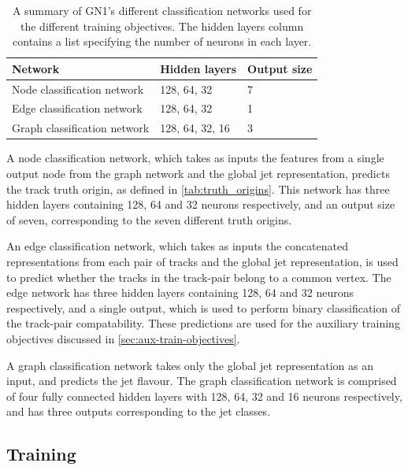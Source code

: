 \begin{table}[!htbp]
  \footnotesize\centering
  \setlength{\tabcolsep}{0.5em} %
  \caption{
      A summary of GN1's different classification networks used for the different training objectives.
      The hidden layers column contains a list specifying the number of neurons in each layer.
      }
  \begin{tabular}{lll}
      \toprule 
      \textbf{Network} & \textbf{Hidden layers} & \textbf{Output size} \\
      \hline
      Node classification network    & 128, 64, 32 & 7 \\
      Edge classification network    & 128, 64, 32 & 1 \\
      Graph classification network   & 128, 64, 32, 16 & 3 \\
      \bottomrule
  \end{tabular}
  \vspace{4mm}
  \label{tab:architecture}
\end{table}



A node classification network, which takes as inputs the features from a single output node from the graph network and the global jet representation, predicts the track truth origin, as defined in \cref{tab:truth_origins}.
This network has three hidden layers containing 128, 64 and 32 neurons respectively, and an output size of seven, corresponding to the seven different truth origins.

An edge classification network, which takes as inputs the concatenated representations from each pair of tracks and the global jet representation, is used to predict whether the tracks in the track-pair belong to a common vertex.
The edge network has three hidden layers containing 128, 64 and 32 neurons respectively, and a single output, which is used to perform binary classification of the track-pair compatability.
These predictions are used for the auxiliary training objectives discussed in \cref{sec:aux-train-objectives}.

A graph classification network takes only the global jet representation as an input, and predicts the jet flavour. 
The graph classification network is comprised of four fully connected hidden layers with 128, 64, 32 and 16 neurons respectively, and has three outputs corresponding to the \bcl jet classes. 



\subsection{Training}\label{sec:training}

